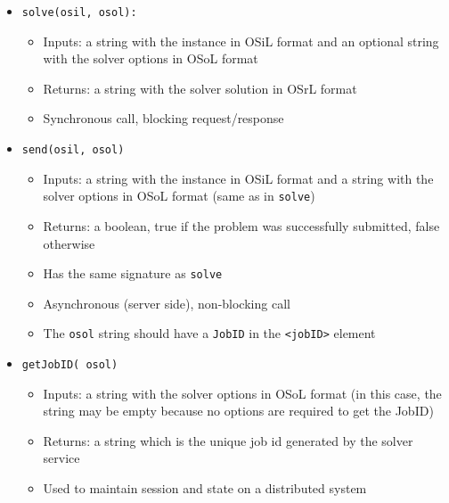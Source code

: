 \documentclass[11pt]{article}
\renewcommand{\_}{{\char"5F}}
\renewcommand{\{}{{\char"7B}}
\renewcommand{\}}{{\char"7D}}
\renewcommand{\^}{{\char"0D}}
\renewcommand{\'}{{\char"0D}}
\begin{document}
\begin{itemize}
\item {\tt solve(osil, osol):}

\begin{itemize}

\item Inputs: a string with the instance in OSiL format and an optional string with the solver options in OSoL format

\item  Returns: a string with the solver solution in OSrL format

\item  Synchronous call, blocking request/response

\end{itemize}



\item {\tt send(osil, osol)}


\begin{itemize}

\item Inputs: a string with the instance in OSiL format and a string with the solver options in OSoL format (same as in {\tt solve})

\item Returns:  a boolean, true if the problem was successfully submitted, false otherwise

\item Has the same signature as {\tt solve}

\item  Asynchronous (server side), non-blocking call

\item The {\tt osol} string should have a {\tt JobID} in the {\tt <jobID>} element
\end{itemize}

\item {\tt getJobID( osol)}

\begin{itemize}

\item Inputs: a string  with the solver options in OSoL format (in this case, the string may be empty because no options are required to get the JobID)

\item  Returns: a string which is the unique job id generated by the solver service

\item  Used to maintain session and state on a distributed system
\end{itemize}




\end{itemize}
\end{document}
